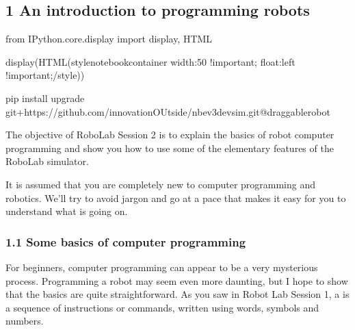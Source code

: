 \documentclass[letterpaper,10pt,english]{sphinxmanual}
\begin{document}
\subsection{1 An introduction to programming robots}
\label{\detokenize{content/01_Robot_Lab/Section_00_01:1-An-introduction-to-programming-robots}}\label{\detokenize{content/01_Robot_Lab/Section_00_01::doc}}
{
\begin{sphinxVerbatim}[commandchars=\\\{\}]
\llap{\color{nbsphinxin}[ ]:\,\hspace{\fboxrule}\hspace{\fboxsep}}from IPython.core.display import display, HTML

display(HTML(\PYGZdq{}\PYGZlt{}style\PYGZgt{}\PYGZsh{}notebook\PYGZhy{}container \PYGZob{} width:50\PYGZpc{} !important; float:left !important;\PYGZcb{}\PYGZlt{}/style\PYGZgt{}\PYGZdq{}))

\end{sphinxVerbatim}
}

{
\begin{sphinxVerbatim}[commandchars=\\\{\}]
\llap{\color{nbsphinxin}[ ]:\,\hspace{\fboxrule}\hspace{\fboxsep}}\PYGZsh{}\PYGZpc{}pip install \PYGZhy{}\PYGZhy{}upgrade git+https://github.com/innovationOUtside/nbev3devsim.git@draggable\PYGZhy{}robot
\end{sphinxVerbatim}
}

The objective of RoboLab Session 2 is to explain the basics of robot computer programming and show you how to use some of the elementary features of the RoboLab simulator.

It is assumed that you are completely new to computer programming and robotics. We’ll try to avoid jargon and go at a pace that makes it easy for you to understand what is going on.


\subsubsection{1.1 Some basics of computer programming}
\label{\detokenize{content/01_Robot_Lab/Section_00_01:1.1-Some-basics-of-computer-programming}}
For beginners, computer programming can appear to be a very mysterious process. Programming a robot may seem even more daunting, but I hope to show that the basics are quite straightforward. As you saw in Robot Lab Session 1, a  is a sequence of instructions or commands, written using words, symbols and numbers.
\end{document}
